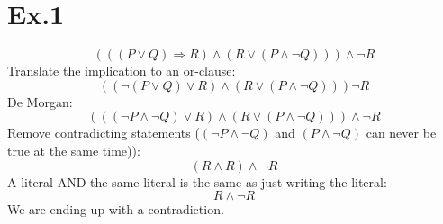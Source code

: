 \documentclass[11pt]{article}
\begin{document}
\section*{Ex.1}
$$(((P \vee Q) \Rightarrow R) \wedge (R \vee (P \wedge \neg Q))) \wedge \neg R$$
Translate the implication to an or-clause:
$$((\neg(P \vee Q) \vee R) \wedge (R \vee (P \wedge \neg Q))) \neg R$$
De Morgan:
$$(((\neg P \wedge \neg Q) \vee R) \wedge (R \vee (P \wedge \neg Q))) \wedge \neg R$$
Remove contradicting statements ($(\neg P \wedge \neg Q)$ and $(P \wedge \neg Q)$ can never be true at the same time)):
$$(R \wedge R) \wedge \neg R$$
A literal AND the same literal is the same as just writing the literal:
$$R \wedge \neg R$$
We are ending up with a contradiction.
\end{document}
